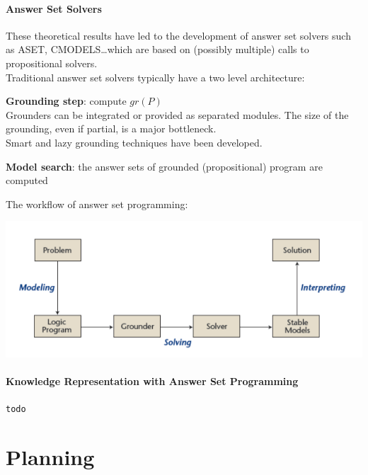 \documentclass[10pt]{report}
\begin{document}
\paragraph{Answer Set Solvers} These theoretical results have led to the development of answer set solvers such as ASET, CMODELS\ldots which are based on (possibly multiple) calls to propositional solvers.\\
Traditional answer set solvers typically have a two level architecture:
\begin{list}{}{}
	\item \textbf{Grounding step}: compute $gr(P)$\\
	Grounders can be integrated or provided as separated modules. The size of the grounding, even if partial, is a major bottleneck.\\
	Smart and lazy grounding techniques have been developed.
	\item \textbf{Model search}: the answer sets of grounded (propositional) program are computed
\end{list}
The workflow of answer set programming:
\begin{center}
	\includegraphics[scale=0.75]{21.png}
\end{center}
\paragraph{Knowledge Representation with Answer Set Programming} \texttt{todo}
\section{Planning}
\end{document}
